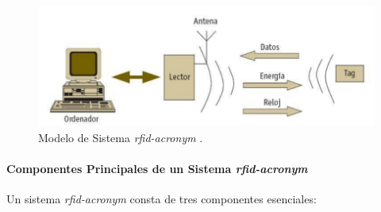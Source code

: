 \begin{figure}[H]
\leavevmode
\begin{minipage}{\textwidth}
\begin{center}
\includegraphics[scale=0.6]{./capitulo_02/figures/RFIDD}
\caption{Modelo de Sistema \textit{\acrshort{rfid-acronym}} \cite{proyectoRFID}. \label{fig:RFID}}
\end{center}
\end{minipage}
\end{figure}

\paragraph{Componentes Principales de un Sistema \textit{\acrshort{rfid-acronym}}\\}

Un sistema \textit{\acrshort{rfid-acronym}} consta de tres componentes esenciales:

